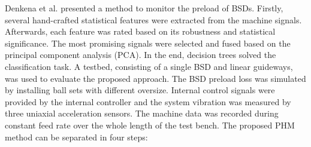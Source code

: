 Denkena et al. \cite{Denkena2021} presented a method to monitor the preload of BSDs. Firstly, several hand-crafted statistical features were extracted from the machine signals. Afterwards, each feature was rated based on its robustness and statistical significance. The most promising signals were selected and fused based on the principal component analysis (PCA). In the end, decision trees solved the classification task. A testbed, consisting of a single BSD and linear guideways, was used to evaluate the proposed approach. The BSD preload loss was simulated by installing ball sets with different oversize. Internal control signals were provided by the internal controller and the system vibration was measured by three uniaxial acceleration sensors. The machine data was recorded during constant feed rate over the whole length of the test bench. The proposed PHM method can be separated in four steps:

